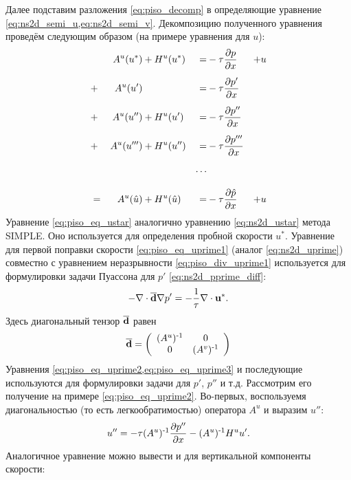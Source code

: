 Далее подставим разложения \cref{eq:piso_decomp} в определяющие уравнение \cref{eq:ns2d_semi_u,eq:ns2d_semi_v}.
Декомпозицию полученного уравнения проведём следующим образом (на примере уравнения для $u$):
\begin{alignat}{6}
& & A^u(u^*)    & + H^u(u^*)     &  =  & -\tau\dfrac{\partial p}{\partial x}    & + u     \label{eq:piso_eq_ustar}\\[5pt]
&+& A^u(u')     &                &  =  & -\tau\dfrac{\partial p'}{\partial x}   &         \label{eq:piso_eq_uprime1}\\[5pt]
&+& A^u(u'')    & + H^u(u')      &  =  & -\tau\dfrac{\partial p''}{\partial x}  &         \label{eq:piso_eq_uprime2}\\[5pt]
&+& A^u(u''')   & + H^u(u'')     &  =  & -\tau\dfrac{\partial p'''}{\partial x} &         \label{eq:piso_eq_uprime3}\\[5pt]
& &             &                &\dots&                     &\nonumber\\[10pt]
&=& A^u(\hat u) & + H^u(\hat u)  &  =  & -\tau\dfrac{\partial \hat p}{\partial x} & + u \nonumber
\end{alignat}
Уравнение \cref{eq:piso_eq_ustar} аналогично уравнению \cref{eq:ns2d_ustar} метода SIMPLE.
Оно используется для определения пробной скорости $u^*$.
Уравнение для первой поправки скорости \cref{eq:piso_eq_uprime1} (аналог \cref{eq:ns2d_uprime})
совместно с уравнением неразрывности \cref{eq:piso_div_uprime1} используется для формулировки задачи Пуассона для $p'$ \cref{eq:ns2d_pprime_diff}:
\begin{equation}
\label{eq:piso_eq_p_prime1}
- \nabla \cdot \boldsymbol{\overline{\rm d}} \nabla p' = - \frac1\tau \nabla \cdot \boldsymbol{\rm u}^*.
\end{equation}
Здесь диагональный тензор $\boldsymbol{\overline{\rm d}}$ равен
\begin{equation*}
\boldsymbol{\overline{\rm d}} = \left(
\begin{array}{cc}
(A^u)^{\text{-} 1} & 0                \\
0                 & (A^v)^{\text{-} 1}
\end{array}
\right)
\end{equation*}
Уравнения \cref{eq:piso_eq_uprime2,eq:piso_eq_uprime3} и последующие используются для формулировки задачи для $p'$, $p''$ и т.д.
Рассмотрим его получение на примере \cref{eq:piso_eq_uprime2}.
Во-первых, воспользуемя диагональностью (то есть легкообратимостью) оператора $A^u$ и выразим $u''$:
\begin{equation*}
u'' = -\tau (A^u)^{\text{-} 1}\frac{\partial p''}{\partial x} - (A^u)^{\text{-} 1} H^u u'.
\end{equation*}
Аналогичное уравнение можно вывести и для вертикальной компоненты скорости:
